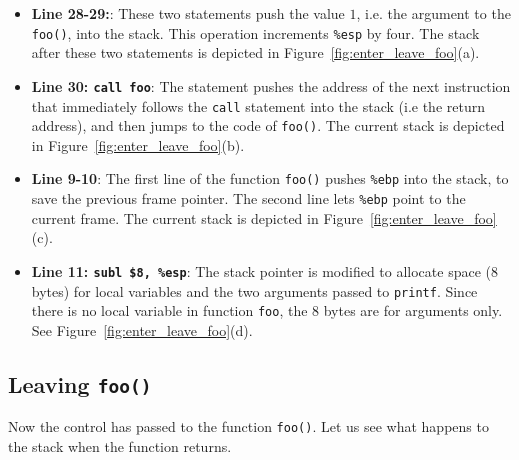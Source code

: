 \begin{itemize}
\item \textbf{Line 28-29:}:
These two statements push the value $1$, i.e. the argument to the {\tt foo()}, 
into the stack. This operation increments {\tt \%esp} by four. The stack
after these two statements is depicted in Figure~\ref{fig:enter_leave_foo}(a).

\item \textbf{Line 30: \texttt{call foo}}: 
The statement pushes the address of the next instruction that 
immediately follows the {\tt call} statement into the 
stack (i.e the return address), and then jumps to the 
code of {\tt foo()}. 
The current stack is depicted in Figure~\ref{fig:enter_leave_foo}(b).

\item \textbf{Line 9-10}:
The first line of the function {\tt foo()} pushes {\tt \%ebp} into
the stack, to save the previous frame pointer. The second
line lets {\tt \%ebp} point to the current frame. The current stack 
is depicted in Figure~\ref{fig:enter_leave_foo}(c). 

\item \textbf{Line 11: \texttt{subl \$8, \%esp}}:
The stack pointer is modified to allocate space (8 bytes) for 
local variables and the two arguments passed to {\tt printf}. 
Since there is no local variable in function {\tt foo}, the
8 bytes are for arguments only. 
See Figure~\ref{fig:enter_leave_foo}(d). 

\end{itemize}


\subsection{Leaving {\tt foo()}}

Now the control has passed to the function {\tt foo()}. Let us see what happens
to the stack when the function returns.

